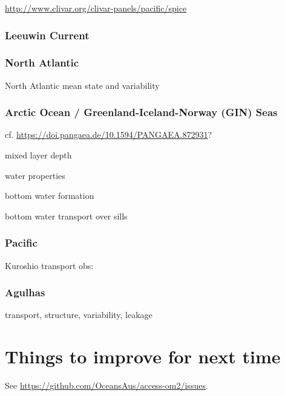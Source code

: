 \documentclass[11pt]{article}
\begin{document}
\url{http://www.clivar.org/clivar-panels/pacific/spice}

\subsubsection{Leeuwin Current}
\citet{WijeratnePattiaratchiProctor2018a}
\citet{FengZhangOkeMonselesanChamberlainMatearSchiller2016a}

\subsubsection{North Atlantic}
North Atlantic mean state \citet{DanabasogluYeagerBaileyBehrensBentsenBiBiastochBoningBozec2014a}
and variability \citet{DanabasogluYeagerKimBehrensBentsenBiBiastochBleckBoning2016a}

\subsubsection{Arctic Ocean / Greenland-Iceland-Norway (GIN) Seas}

cf. \citet{BehrendtSumataRabeSchauer2018a} \url{https://doi.pangaea.de/10.1594/PANGAEA.872931}?

mixed layer depth

water properties

bottom water formation

bottom water transport over sills

\citet{WangIlicakGerdesDrangeAksenovBaileyBentsenBiastochBozec2016b}
\citet{IlicakDrangeWangGerdesAksenovBaileyBentsenBiastochBozec2016a}

\subsubsection{Pacific}
\citet{TsengLinChenThompsonBentsenBoningBozecCassouChassignet2016a}

Kuroshio transport obs: \citet{JohnsLeeZhangZantoppLiuYang2001a}

\subsubsection{Agulhas}
transport, structure, variability, leakage
 
 \newpage
 
\section{Things to improve for next time}
See \url{https://github.com/OceansAus/access-om2/issues}.
\end{document}
